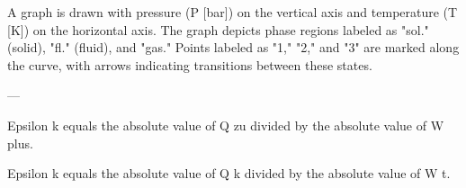 A graph is drawn with pressure (P [bar]) on the vertical axis and temperature (T [K]) on the horizontal axis. The graph depicts phase regions labeled as "sol." (solid), "fl." (fluid), and "gas." Points labeled as "1," "2," and "3" are marked along the curve, with arrows indicating transitions between these states.

---

Epsilon k equals the absolute value of Q zu divided by the absolute value of W plus.  

Epsilon k equals the absolute value of Q k divided by the absolute value of W t.
